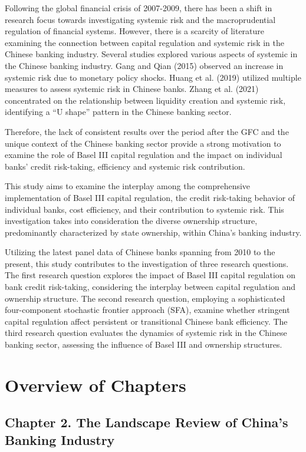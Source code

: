 \documentclass[
  letterpaper,
  DIV=11,
  numbers=noendperiod]{scrreprt}
\begin{document}
Following the global financial crisis of 2007-2009, there has been a
shift in research focus towards investigating systemic risk and the
macroprudential regulation of financial systems. However, there is a
scarcity of literature examining the connection between capital
regulation and systemic risk in the Chinese banking industry. Several
studies explored various aspects of systemic in the Chinese banking
industry. Gang and Qian (2015) observed an increase in systemic risk due
to monetary policy shocks. Huang et al. (2019) utilized multiple
measures to assess systemic risk in Chinese banks. Zhang et al. (2021)
concentrated on the relationship between liquidity creation and systemic
risk, identifying a ``U shape'' pattern in the Chinese banking sector.

Therefore, the lack of consistent results over the period after the GFC
and the unique context of the Chinese banking sector provide a strong
motivation to examine the role of Basel III capital regulation and the
impact on individual banks' credit risk-taking, efficiency and systemic
risk contribution.

This study aims to examine the interplay among the comprehensive
implementation of Basel III capital regulation, the credit risk-taking
behavior of individual banks, cost efficiency, and their contribution to
systemic risk. This investigation takes into consideration the diverse
ownership structure, predominantly characterized by state ownership,
within China's banking industry.

Utilizing the latest panel data of Chinese banks spanning from 2010 to
the present, this study contributes to the investigation of three
research questions. The first research question explores the impact of
Basel III capital regulation on bank credit risk-taking, considering the
interplay between capital regulation and ownership structure. The second
research question, employing a sophisticated four-component stochastic
frontier approach (SFA), examine whether stringent capital regulation
affect persistent or transitional Chinese bank efficiency. The third
research question evaluates the dynamics of systemic risk in the Chinese
banking sector, assessing the influence of Basel III and ownership
structures.

\section{Overview of Chapters}\label{overview-of-chapters}

\subsection{Chapter 2. The Landscape Review of China's Banking
Industry}\label{chapter-2.-the-landscape-review-of-chinas-banking-industry}
\end{document}
